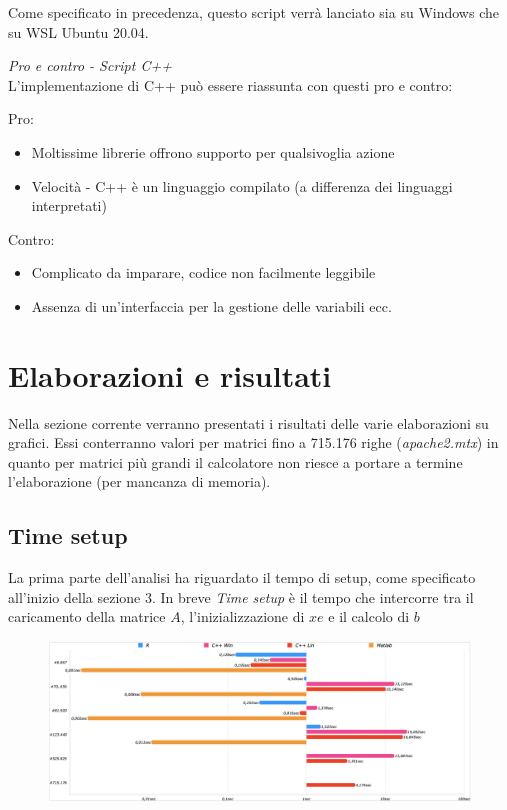 \documentclass[preprint,12pt]{elsarticle}
\begin{document}
Come specificato in precedenza, questo script verrà lanciato sia su Windows che su WSL Ubuntu 20.04.
\medskip


\textit{Pro e contro - Script C++}\\
\vspace{4mm}
L'implementazione di C++ può essere riassunta con questi pro e contro:

Pro:
\begin{itemize}
	\item Moltissime librerie offrono supporto per qualsivoglia azione
	\item Velocità - C++ è un linguaggio compilato (a differenza dei linguaggi interpretati)
\end{itemize}

Contro:
\begin{itemize}
	\item Complicato da imparare, codice non facilmente leggibile
	\item Assenza di un'interfaccia per la gestione delle variabili ecc.
\end{itemize}

\newpage


\section*{Elaborazioni e risultati}

Nella sezione corrente verranno presentati i risultati delle varie elaborazioni su grafici. Essi conterranno valori per matrici fino a 715.176 righe (\textit{apache2.mtx}) in quanto per matrici più grandi il calcolatore non riesce a portare a termine l'elaborazione (per mancanza di memoria).

\subsection*{Time setup}La prima parte dell'analisi ha riguardato il tempo di setup, come specificato all'inizio della sezione 3.
In breve \textit{Time setup} è il tempo che intercorre tra il caricamento della matrice $A$, l'inizializzazione di $xe$ e il calcolo di $b$

\begin{figure}[H]
	\centering
	\includegraphics[width=\linewidth]{setup1}
\end{figure}
\end{document}
